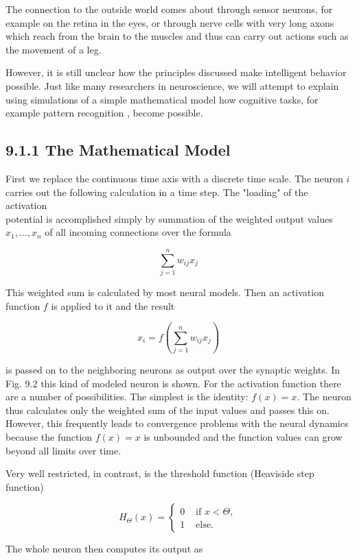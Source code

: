 \documentclass[10pt]{article}
\begin{document}
The connection to the outside world comes about through sensor neurons, for example on the retina in the eyes, or through nerve cells with very long axons which reach from the brain to the muscles and thus can carry out actions such as the movement of a leg.

However, it is still unclear how the principles discussed make intelligent behavior possible. Just like many researchers in neuroscience, we will attempt to explain using simulations of a simple mathematical model how cognitive tasks, for example pattern recognition
, become possible.

\subsection*{9.1.1 The Mathematical Model}
First we replace the continuous time axis with a discrete time scale. The neuron $i$ carries out the following calculation in a time step. The "loading" of the activation\\
potential is accomplished simply by summation of the weighted output values $x_{1}, \ldots, x_{n}$ of all incoming connections over the formula

$$
\sum_{j=1}^{n} w_{i j} x_{j}
$$

This weighted sum is calculated by most neural models. Then an activation function $f$ is applied to it and the result

$$
x_{i}=f\left(\sum_{j=1}^{n} w_{i j} x_{j}\right)
$$

is passed on to the neighboring neurons as output over the synaptic weights. In Fig. 9.2 this kind of modeled neuron is shown. For the activation function there are a number of possibilities. The simplest is the identity: $f(x)=x$. The neuron thus calculates only the weighted sum of the input values and passes this on. However, this frequently leads to convergence problems with the neural dynamics because the function $f(x)=x$ is unbounded and the function values can grow beyond all limits over time.

Very well restricted, in contrast, is the threshold function (Heaviside step function)

$$
H_{\Theta}(x)= \begin{cases}0 & \text { if } x<\Theta, \\ 1 & \text { else. }\end{cases}
$$

The whole neuron then computes its output as
\end{document}
